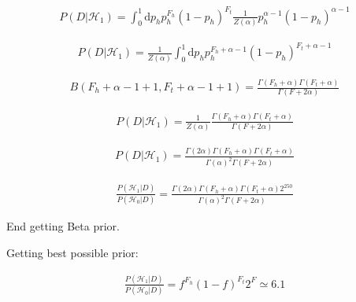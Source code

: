 \documentclass[12pt]{article}
\begin{document}
\begin{gather}
P(D|\mathcal{H}_1) = \int_0^1 \! \mathrm{d}p_h p_h^{F_h}(1 - p_h)^{F_t} \frac{1}{Z(\alpha)}   p_h^{\alpha-1}(1-p_h)^{\alpha-1}
\end{gather}

\begin{gather}
P(D|\mathcal{H}_1) = \frac{1}{Z(\alpha)}   \int_0^1 \! \mathrm{d}p_h p_h^{F_h+\alpha-1}(1 - p_h)^{F_t+\alpha-1}
\end{gather}

\begin{gather}
B(F_h+\alpha-1+1,F_t+\alpha-1+1) = \frac{\Gamma(F_h+\alpha)\Gamma(F_t+\alpha)}{\Gamma(F+2\alpha)}
\end{gather}

\begin{gather}
P(D|\mathcal{H}_1) = \frac{1}{Z(\alpha)} \frac{\Gamma(F_h+\alpha)\Gamma(F_t+\alpha)}{\Gamma(F+2\alpha)}
\end{gather}

\begin{gather}
P(D|\mathcal{H}_1) = \frac{\Gamma(2\alpha)\Gamma(F_h+\alpha)\Gamma(F_t+\alpha)}{\Gamma(\alpha)^2\Gamma(F+2\alpha)}
\end{gather}

\begin{gather}
\frac{P(\mathcal{H}_1 | D)}{P(\mathcal{H}_0 | D)} =
\frac{\Gamma(2\alpha)\Gamma(F_h+\alpha)\Gamma(F_t+\alpha)2^{250}}
{\Gamma(\alpha)^2\Gamma(F+2\alpha)}
\end{gather}

End getting Beta prior.
 
Getting best possible prior:
 
\begin{gather}
 \frac{P(\mathcal{H}_1 | D)}{P(\mathcal{H}_0 | D)} =
 f^{F_h}(1-f)^{F_t}2^F \simeq 6.1
\end{gather}
\end{document}
